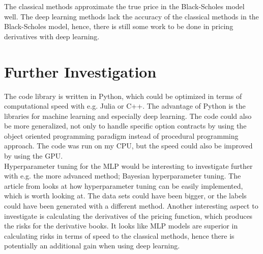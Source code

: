 The classical methods approximate the true price in the Black-Scholes model well. The deep learning methods lack the accuracy of the classical methods in the Black-Scholes model, hence, there is still some work to be done in pricing derivatives with deep learning. 

\section{Further Investigation}
The code library is written in Python, which could be optimized in terms of computational speed with e.g. Julia or C++. The advantage of Python is the libraries for machine learning and especially deep learning. The code could also be more generalized, not only to handle specific option contracts by using the object oriented programming paradigm instead of procedural programming approach. The code was run on my CPU, but the speed could also be improved by using the GPU.\\

Hyperparameter tuning for the MLP would be interesting to investigate further with e.g. the more advanced method; Bayesian hyperparameter tuning. The article from \parencite{liaw2018tune} looks at how hyperparameter tuning can be easily implemented, which is worth looking at. The data sets could have been bigger, or the labels could have been generated with a different method. Another interesting aspect to investigate is calculating the derivatives of the pricing function, which produces the risks for the derivative books. It looks like MLP models are superior in calculating risks in terms of speed to the classical methods, hence there is potentially an additional gain when using deep learning.\\


